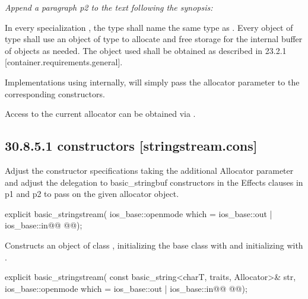 \documentclass[ebook,11pt,article]{memoir}
\begin{document}
\textit{Append a paragraph p2 to the text following the synopsis:}

\begin{insrt}
\pnum
In every specialization , the type  shall name the same type as . Every object of type  shall use an object of type  to allocate and free storage for the internal buffer of  objects as needed. The  object used shall be obtained as described in 23.2.1 [container.requirements.general].
\begin{note}
Implementations using  internally, will simply pass the allocator parameter to the corresponding  constructors.
\end{note}
\begin{note}
Access to the current allocator can be obtained via .
\end{note}
\end{insrt}

\subsection{30.8.5.1  constructors [stringstream.cons]}
Adjust the constructor specifications taking the additional Allocator parameter and adjust the delegation to basic_stringbuf constructors in the Effects clauses in p1 and p2 to pass on the given allocator object.
\begin{itemdecl}
explicit basic_stringstream(
  ios_base::openmode which = ios_base::out | ios_base::in@\added{,}@
  @@);
\end{itemdecl}

\begin{itemdescr}
\pnum
\effects
Constructs an object of class
,
initializing the base class with
and initializing
with
.
\end{itemdescr}

%
\begin{itemdecl}
explicit basic_stringstream(
  const basic_string<charT, traits, Allocator>& str,
  ios_base::openmode which = ios_base::out | ios_base::in@\added{,}@
  @@);
\end{itemdecl}
\end{document}
